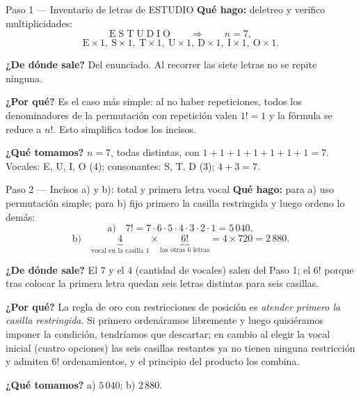 \documentclass[11pt]{article}
\begin{document}
\begin{paso}{Paso 1 --- Inventario de letras de ESTUDIO}
\textbf{Qué hago:} deletreo y verifico multiplicidades:
\[
\text{E}\;\text{S}\;\text{T}\;\text{U}\;\text{D}\;\text{I}\;\text{O}\qquad\Longrightarrow\qquad n=7,
\]
\[
\text{E}\times1,\ \text{S}\times1,\ \text{T}\times1,\ \text{U}\times1,\ \text{D}\times1,\ \text{I}\times1,\ \text{O}\times1 .
\]

\textbf{¿De dónde sale?} Del enunciado. Al recorrer las siete letras no se repite ninguna.

\textbf{¿Por qué?} Es el caso más simple: al no haber repeticiones, todos los denominadores de la
permutación con repetición valen $1!=1$ y la fórmula se reduce a $n!$. Esto simplifica todos los incisos.

\textbf{¿Qué tomamos?} $n=7$, todas distintas, con $1+1+1+1+1+1+1=7$. Vocales: E, U, I, O ($4$);
consonantes: S, T, D ($3$); $4+3=7$.
\end{paso}

\begin{paso}{Paso 2 --- Incisos a) y b): total y primera letra vocal}
\textbf{Qué hago:} para a) uso permutación simple; para b) fijo primero la casilla restringida y luego
ordeno lo demás:
\[
\text{a)}\quad 7!=7\cdot6\cdot5\cdot4\cdot3\cdot2\cdot1=5\,040 ,
\]
\[
\text{b)}\quad \underbrace{4}_{\text{vocal en la casilla 1}}\times\underbrace{6!}_{\text{las otras 6 letras}}=4\times 720=2\,880 .
\]

\textbf{¿De dónde sale?} El $7$ y el $4$ (cantidad de vocales) salen del Paso 1; el $6!$ porque tras
colocar la primera letra quedan seis letras distintas para seis casillas.

\textbf{¿Por qué?} La regla de oro con restricciones de posición es \emph{atender primero la casilla
restringida}. Si primero ordenáramos libremente y luego quisiéramos imponer la condición, tendríamos que
descartar; en cambio al elegir la vocal inicial (cuatro opciones) las seis casillas restantes ya no tienen
ninguna restricción y admiten $6!$ ordenamientos, y el principio del producto los combina.

\textbf{¿Qué tomamos?} a) $5\,040$; b) $2\,880$.
\end{paso}
\end{document}
